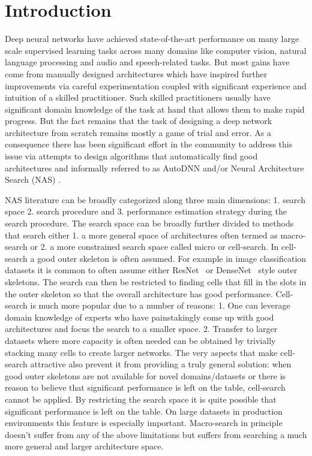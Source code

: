 \section{Introduction}

Deep neural networks have achieved state-of-the-art performance on many large scale supervised learning tasks across many domains like computer vision, natural language processing and audio and speech-related tasks. But most gains have come from manually designed architectures which have inspired further improvements via careful experimentation coupled with significant experience and intuition of a skilled practitioner. Such skilled practitioners usually have significant domain knowledge of the task at hand that allows them to make rapid progress. But the fact remains that the task of designing a deep network architecture from scratch remains mostly a game of trial and error. As a consequence there has been significant effort in the community to address this issue via attempts to design algorithms that automatically find good architectures and informally referred to as AutoDNN and/or Neural Architecture Search (NAS) \cite{nas}. 

NAS literature can be broadly categorized along three main dimensions: 1. search space 2. search procedure and 3. performance estimation strategy during the search procedure. The search space can be broadly further divided to methods that search either 1. a more general space of architectures often termed as macro-search or 2. a more constrained search space called micro or cell-search. In cell-search a good outer skeleton is often assumed. For example in image classification datasets it is common to often assume either ResNet~\citep{resnet} or DenseNet~\cite{densenet} style outer skeletons. The search can then be restricted to finding cells that fill in the slots in the outer skeleton so that the overall architecture has good performance. Cell-search is much more popular due to a number of reasons: 1. One can leverage domain knowledge of experts who have painstakingly come up with good architectures and focus the search to a smaller space. 2. Transfer to larger datasets where more capacity is often needed can be obtained by trivially stacking many cells to create larger networks. The very aspects that make cell-search attractive also prevent it from providing a truly general solution: when good outer skeletons are not available for novel domains/datasets or there is reason to believe that significant performance is left on the table, cell-search cannot be applied. By restricting the search space it is quite possible that significant performance is left on the table. On large datasets in production environments this feature is especially important. Macro-search in principle doesn't suffer from any of the above limitations but suffers from searching a much more general and larger architecture space. 

